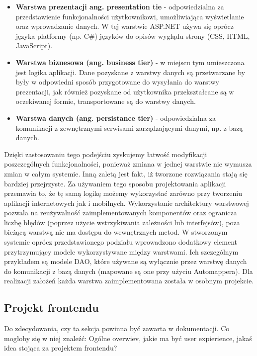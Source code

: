 \documentclass{article}
\begin{document}
\begin{itemize}
\item \textbf{Warstwa prezentacji ang. presentation tie} - odpowiedzialna za przedstawienie funkcjonalności użytkownikowi, umożliwiająca wyświetlanie oraz wprowadzanie danych. W tej warstwie ASP.NET używa się oprócz języka platformy (np. C\#) języków do opisów wyglądu strony (CSS, HTML, JavaScript). 
\item \textbf{Warstwa biznesowa (ang. business tier)} - w miejscu tym umieszczona jest logika aplikacji. Dane pozyskane z warstwy danych są przetwarzane by były w odpowiedni sposób przygotowane do wysyłania do warstwy prezentacji, jak również pozyskane od użytkownika przekształcane są w oczekiwanej formie, transportowane są do warstwy danych.

\item \textbf{Warstwa danych (ang. persistance tier)} - odpowiedzialna za komunikacji z zewnętrznymi serwisami zarządzającymi danymi, np. z bazą danych.
\end{itemize}

Dzięki zastosowaniu tego podejściu zyskujemy łatwość modyfikacji poszczególnych funkcjonalności, ponieważ zmiana w jednej warstwie nie wymusza zmian w całym systemie. Inną zaletą jest fakt, iż tworzone rozwiązania stają się bardziej przejrzyste. Za używaniem tego sposobu projektowania aplikacji przemawia to, że tę samą logikę możemy wykorzystać zarówno przy tworzeniu aplikacji internetowych jak i mobilnych. Wykorzystanie architektury warstwowej pozwala na reużywalność zaimplementowanych komponentów oraz ogranicza liczbę błędów (poprzez użycie wstrzykiwania zależności lub interfejsów), poza bieżącą warstwą nie ma dostępu do wewnętrznych metod. W stworzonym systemie oprócz przedstawionego podziału wprowadzono dodatkowy element przytrzymujący modele wykorzystywane między warstwami. Ich szczególnym przykładem są modele DAO, które używane są wyłącznie przez warstwę danych do komunikacji z bazą danych (mapowane są one przy użyciu Automappera). Dla realizacji założeń każda warstwa zaimplementowana została w osobnym projekcie.

\subsection{Projekt frontendu}
Do zdecydowania, czy ta sekcja powinna być zawarta w dokumentacji.
Co mogłoby się w niej znaleźć:
Ogólne overwiev, jakie ma być user expierience, jakaś idea stojąca za projektem frontendu?
\end{document}

